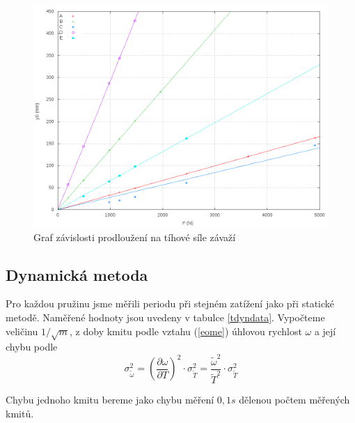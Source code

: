 \documentclass{article}
\begin{document}
\begin{figure} \label{gyf} 
\includegraphics[width=\textwidth]{gyf}

\caption{Graf závislosti prodloužení na tíhové síle závaží}
\end{figure} 

\subsection*{Dynamická metoda}

Pro každou pružinu jsme měřili periodu při stejném zatížení jako při statické metodě. Naměřené hodnoty jsou uvedeny v tabulce \ref{tdyndata}. Vypočteme veličinu $1/\sqrt{m}$, z doby kmitu podle vztahu (\ref{eome}) úhlovou rychlost $\omega$ a její chybu podle
\begin{equation*}
\sigma _{\tilde{\omega}}^{2}=   (\frac{\partial \omega}   {\partial T})^{2} \cdot \sigma _{\tilde{T}}^{2} = \frac{\tilde{\omega} ^{2}}{\tilde{T}^{2}} \cdot \sigma _{\tilde{T}}^{2}
\end{equation*}

Chybu jednoho kmitu bereme jako chybu měření $0,1s$ dělenou počtem měřených kmitů.
\end{document}
